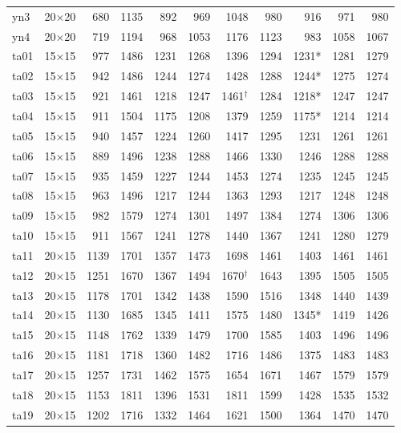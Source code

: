 {\begin{longtable}{lrrrrrrrrrr}
yn3 & 20$\times$20 & 680 & 1135 & 892 & 969 & 1048 & 980 & 916 & 971 & 980 \\
yn4 & 20$\times$20 & 719 & 1194 & 968 & 1053 & 1176 & 1123 & 983 & 1058 & 1067 \\
ta01 & 15$\times$15 & 977 & 1486 & 1231 & 1268 & 1396 & 1294 & 1231* & 1281 & 1279 \\
ta02 & 15$\times$15 & 942 & 1486 & 1244 & 1274 & 1428 & 1288 & 1244* & 1275 & 1274 \\
ta03 & 15$\times$15 & 921 & 1461 & 1218 & 1247 & 1461$^\dagger$ & 1284 & 1218* & 1247 & 1247 \\
ta04 & 15$\times$15 & 911 & 1504 & 1175 & 1208 & 1379 & 1259 & 1175* & 1214 & 1214 \\
ta05 & 15$\times$15 & 940 & 1457 & 1224 & 1260 & 1417 & 1295 & 1231 & 1261 & 1261 \\
ta06 & 15$\times$15 & 889 & 1496 & 1238 & 1288 & 1466 & 1330 & 1246 & 1288 & 1288 \\
ta07 & 15$\times$15 & 935 & 1459 & 1227 & 1244 & 1453 & 1274 & 1235 & 1245 & 1245 \\
ta08 & 15$\times$15 & 963 & 1496 & 1217 & 1244 & 1363 & 1293 & 1217 & 1248 & 1248 \\
ta09 & 15$\times$15 & 982 & 1579 & 1274 & 1301 & 1497 & 1384 & 1274 & 1306 & 1306 \\
ta10 & 15$\times$15 & 911 & 1567 & 1241 & 1278 & 1440 & 1367 & 1241 & 1280 & 1279 \\
ta11 & 20$\times$15 & 1139 & 1701 & 1357 & 1473 & 1698 & 1461 & 1403 & 1461 & 1461 \\
ta12 & 20$\times$15 & 1251 & 1670 & 1367 & 1494 & 1670$^\dagger$ & 1643 & 1395 & 1505 & 1505 \\
ta13 & 20$\times$15 & 1178 & 1701 & 1342 & 1438 & 1590 & 1516 & 1348 & 1440 & 1439 \\
ta14 & 20$\times$15 & 1130 & 1685 & 1345 & 1411 & 1575 & 1480 & 1345* & 1419 & 1426 \\
ta15 & 20$\times$15 & 1148 & 1762 & 1339 & 1479 & 1700 & 1585 & 1403 & 1496 & 1496 \\
ta16 & 20$\times$15 & 1181 & 1718 & 1360 & 1482 & 1716 & 1486 & 1375 & 1483 & 1483 \\
ta17 & 20$\times$15 & 1257 & 1731 & 1462 & 1575 & 1654 & 1671 & 1467 & 1579 & 1579 \\
ta18 & 20$\times$15 & 1153 & 1811 & 1396 & 1531 & 1811 & 1599 & 1428 & 1535 & 1532 \\
ta19 & 20$\times$15 & 1202 & 1716 & 1332 & 1464 & 1621 & 1500 & 1364 & 1470 & 1470 \\

\end{longtable}}

